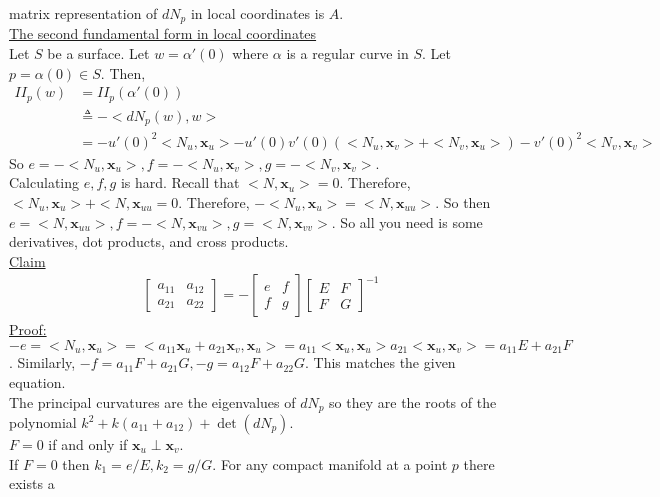 \documentclass[12pt,letterpaper]{hmcpset}
\begin{document}
matrix representation of $dN_p$ in local coordinates is $A$.  \\
\underline{The second fundamental form in local coordinates} \\
Let $S$ be a surface. Let $w = \alpha'(0)$ where $\alpha$ is a regular curve in $S$. Let $p =
\alpha(0) \in S$. Then,
\begin{align*}
  II_p(w) &= II_p(\alpha'(0)) \\
  &\triangleq -<dN_p(w), w> \\
  &= -u'(0)^2<N_u, \mathbf{x}_u> - u'(0)v'(0)(<N_u, \mathbf{x}_v> + <N_v, \mathbf{x}_u>) - v'(0)^2<N_v, \mathbf{x}_v>
\end{align*}
So $e=-<N_u, \mathbf{x}_u>, f=-<N_u, \mathbf{x}_v>, g=-<N_v, \mathbf{x}_v>$. \\
Calculating $e, f, g$ is hard. Recall that $<N, \mathbf{x}_u> = 0$. Therefore,
$<N_u, \mathbf{x}_u> + <N, \mathbf{x}_{uu} = 0$. Therefore, $-<N_u,
\mathbf{x}_u> = <N, \mathbf{x}_{uu}>$. So then $e = <N, \mathbf{x}_{uu}>, f=-<N,
\mathbf{x}_{vu}>, g=<N, \mathbf{x}_{vv}>$. So all you need is some derivatives,
dot products, and cross products. \\
\underline{Claim} \\
\begin{align*}
  \begin{bmatrix}a_{11} & a_{12}\\
a_{21} & a_{22}
\end{bmatrix} = -\begin{bmatrix}e & f \\ f & g\end{bmatrix} \begin{bmatrix}E & F
\\ F & G\end{bmatrix}^{-1}
\end{align*}
\underline{Proof:} \\
$-e = <N_u, \mathbf{x}_u> = <a_{11}\mathbf{x}_u + a_{21}\mathbf{x}_v,
\mathbf{x}_u> = a_{11}<\mathbf{x}_u, \mathbf{x}_u> a_{21}<\mathbf{x}_u,
\mathbf{x}_v> = a_{11}E + a_{21}F$. Similarly, $-f = a_{11}F + a_{21}G,
-g=a_{12}F + a_{22}G$. This matches the given equation.\\
The principal curvatures are the eigenvalues of $dN_p$ so they are the roots of
the polynomial $k^2 + k(a_{11} + a_{12}) + \det(dN_p)$. \\
$F=0$ if and only if $\mathbf{x}_u \perp \mathbf{x}_v$. \\
If $F=0$ then $k_1 = e/E, k_2=g/G$. For any compact manifold at a point $p$ there exists a
\end{document}
